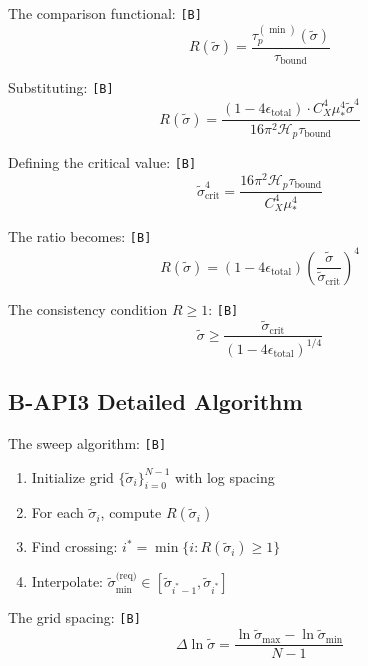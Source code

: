 \documentclass[11pt,a4paper]{article}
\newcommand{\tagB}{\textcolor{purple!70!black}{\texttt{[B]}}}
\theoremstyle{definition}
\begin{document}
The comparison functional: \tagB{}
\begin{equation}
\label{eq:api2-def}
R(\tilde{\sigma}) = \frac{\tau_p^{(\min)}(\tilde{\sigma})}{\tau_{\text{bound}}}
\end{equation}

Substituting: \tagB{}
\begin{equation}
\label{eq:api2-subst}
R(\tilde{\sigma}) = \frac{(1 - 4\epsilon_{\text{total}}) \cdot C_X^4 \mu_*^4 \tilde{\sigma}^4}{16\pi^2 \mathcal{H}_p \tau_{\text{bound}}}
\end{equation}

Defining the critical value: \tagB{}
\begin{equation}
\label{eq:api2-crit}
\tilde{\sigma}_{\text{crit}}^4 = \frac{16\pi^2 \mathcal{H}_p \tau_{\text{bound}}}{C_X^4 \mu_*^4}
\end{equation}

The ratio becomes: \tagB{}
\begin{equation}
\label{eq:api2-ratio-simple}
R(\tilde{\sigma}) = (1 - 4\epsilon_{\text{total}}) \left(\frac{\tilde{\sigma}}{\tilde{\sigma}_{\text{crit}}}\right)^4
\end{equation}

The consistency condition $R \geq 1$: \tagB{}
\begin{equation}
\label{eq:api2-consist}
\tilde{\sigma} \geq \frac{\tilde{\sigma}_{\text{crit}}}{(1 - 4\epsilon_{\text{total}})^{1/4}}
\end{equation}

\subsection{B-API3 Detailed Algorithm}
\label{subsec:b-api3-detail}

The sweep algorithm: \tagB{}
\begin{enumerate}
  \item Initialize grid $\{\tilde{\sigma}_i\}_{i=0}^{N-1}$ with log spacing
  \item For each $\tilde{\sigma}_i$, compute $R(\tilde{\sigma}_i)$
  \item Find crossing: $i^* = \min\{i : R(\tilde{\sigma}_i) \geq 1\}$
  \item Interpolate: $\tilde{\sigma}_{\min}^{\text{(req)}} \in [\tilde{\sigma}_{i^*-1}, \tilde{\sigma}_{i^*}]$
\end{enumerate}

The grid spacing: \tagB{}
\begin{equation}
\label{eq:api3-grid}
\Delta\ln\tilde{\sigma} = \frac{\ln\tilde{\sigma}_{\max} - \ln\tilde{\sigma}_{\min}}{N-1}
\end{equation}
\end{document}
